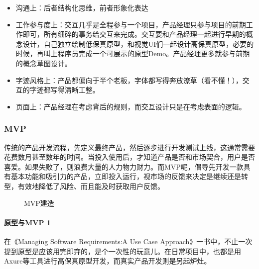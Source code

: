 \documentclass[letterpaper,11pt,english]{sphinxmanual}
\begin{document}
\begin{itemize}
\item {} 
沟通上：后者结构化思维，前者形象化表达

\item {} 
工作参与度上：交互几乎是全程参与一个项目，产品经理只参与项目的前期工作即可，所有细碎的事务给交互来完成。交互要和产品经理一起进行早期的概念设计，自己独立绘制低保真原型，和视觉UI们一起设计高保真原型，必要的时候，再叫上程序员完成一个可展示的原型Demo。产品经理更多就参与前期的概念草图设计。

\item {} 
字迹风格上：产品都偏向于半个老板，字体都写得奔放潦草（看不懂！），交互的字迹都写得清晰工整。

\item {} 
页面上：产品经理在考虑背后的规则，而交互设计只是在考虑表面的逻辑。%
\begin{footnote}[545]\sphinxAtStartFootnote
{}
%
\end{footnote}

\end{itemize}


\subsubsection{MVP}
\label{\detokenize{chapter_knowledge/MVP:mvp}}\label{\detokenize{chapter_knowledge/MVP::doc}}
传统的产品开发流程，先定义最终产品，然后逐步进行开发测试上线，这通常需要花费数月甚至数年的时间。当投入使用后，才知道产品是否和市场契合，用户是否喜爱。如果失败了，则浪费大量的人力物力财力。而MVP呢，倡导先开发一款具有基本功能和吸引力的产品，立即投入运行，视市场的反馈来决定是继续还是转型，有效地降低了风险、而且能及时获取用户反馈。

\begin{figure}[H]
\centering
\capstart

\noindent{}
\caption{MVP建造\sphinxfootnotemark[546]}\label{\detokenize{chapter_knowledge/MVP:id9}}\end{figure}
%
\begin{footnotetext}[546]\sphinxAtStartFootnote
{}
%
\end{footnotetext}\ignorespaces 

\paragraph{原型与MVP 1\sphinxfootnotemark[547]}
\label{\detokenize{chapter_knowledge/MVP:mvp-1}}%
\begin{footnotetext}[547]\sphinxAtStartFootnote
{}
%
\end{footnotetext}\ignorespaces 
在《Managing Software Requirements:A Use Case
Approach》一书中，不止一次提到原型是应该用完即弃的，是个一次性的玩意儿。在日常项目中，也都是用Axure等工具进行高保真原型开发，而真实产品开发则是另起炉灶。
\end{document}
